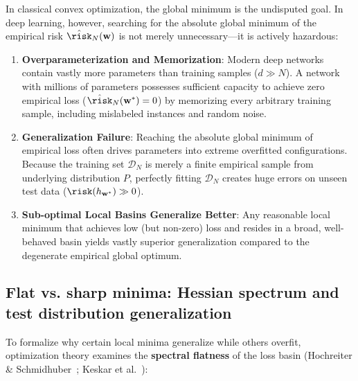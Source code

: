 In classical convex optimization, the global minimum is the undisputed goal. In deep learning, however, searching for the absolute global minimum of the empirical risk $\hat{\risk}_N(\mathbf{w})$ is not merely unnecessary—it is actively hazardous:
\begin{enumerate}
  \item \textbf{Overparameterization and Memorization}: Modern deep networks contain vastly more parameters than training samples ($d \gg N$). A network with millions of parameters possesses sufficient capacity to achieve zero empirical loss ($\hat{\risk}_N(\mathbf{w}^*) = 0$) by memorizing every arbitrary training sample, including mislabeled instances and random noise.
  \item \textbf{Generalization Failure}: Reaching the absolute global minimum of empirical loss often drives parameters into extreme overfitted configurations. Because the training set $\mathcal{D}_N$ is merely a finite empirical sample from underlying distribution $P$, perfectly fitting $\mathcal{D}_N$ creates huge errors on unseen test data ($\risk(h_{\mathbf{w}^*}) \gg 0$).
  \item \textbf{Sub-optimal Local Basins Generalize Better}: Any reasonable local minimum that achieves low (but non-zero) loss and resides in a broad, well-behaved basin yields vastly superior generalization compared to the degenerate empirical global optimum.
\end{enumerate}

\subsection{Flat vs. sharp minima: Hessian spectrum and test distribution generalization}
\label{sec:flat_vs_sharp_minima}

To formalize why certain local minima generalize while others overfit, optimization theory examines the \textbf{spectral flatness} of the loss basin (Hochreiter \& Schmidhuber~\cite{hochreiter1997flat}; Keskar et al.~\cite{keskar2017large}):


